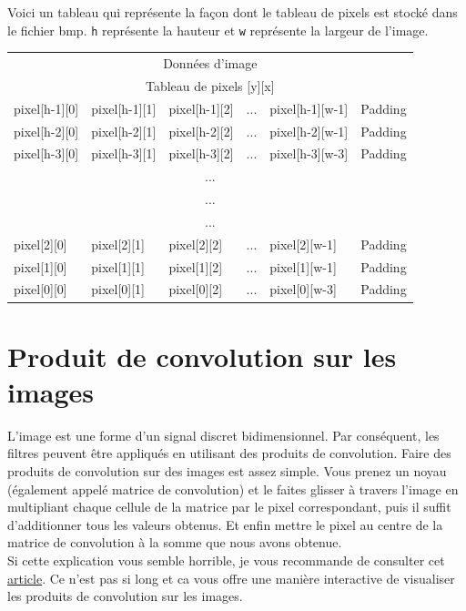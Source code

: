 \documentclass[a4paper]{article}
\begin{document}
	Voici un tableau qui représente la façon dont le tableau de pixels est stocké dans le fichier bmp. \texttt{h} représente la hauteur et \texttt{w} représente la largeur de l'image.
	\begin{center}
		\begin{tabular}{ | p{2.2cm} | p{2.2cm} | p{2.2cm} | p{1.5cm} | p{2.2cm} | p{1.5cm} | }
			\hline
			\multicolumn{6}{|c|}{Données d'image} \\
			\multicolumn{6}{|c|}{Tableau de pixels [y][x]} \\
			\hline
			pixel[h-1][0] & pixel[h-1][1] & pixel[h-1][2] & ... & pixel[h-1][w-1] & Padding \\
			\hline
			pixel[h-2][0] & pixel[h-2][1] & pixel[h-2][2] & ... & pixel[h-2][w-1] & Padding \\
			\hline
			pixel[h-3][0] & pixel[h-3][1] & pixel[h-3][2] & ... & pixel[h-3][w-3] & Padding \\
			\hline
			\multicolumn{6}{|c|}{...} \\
			\multicolumn{6}{|c|}{...} \\
			\multicolumn{6}{|c|}{...} \\
			\hline
			pixel[2][0] & pixel[2][1] & pixel[2][2] & ... & pixel[2][w-1] & Padding \\
			\hline
			pixel[1][0] & pixel[1][1] & pixel[1][2] & ... & pixel[1][w-1] & Padding \\
			\hline
			pixel[0][0] & pixel[0][1] & pixel[0][2] & ... & pixel[0][w-3] & Padding \\
			\hline
		\end{tabular}
	\end{center}
	
	\section*{Produit de convolution sur les images}
	L'image est une forme d'un signal discret bidimensionnel. Par conséquent, les filtres peuvent être appliqués en utilisant des produits de convolution. Faire des produits de convolution sur des images est assez simple. Vous prenez un noyau (également appelé matrice de convolution) et le faites glisser à travers l'image en multipliant chaque cellule de la matrice par le pixel correspondant, puis il suffit d'additionner tous les valeurs obtenus. Et enfin mettre le pixel au centre de la matrice de convolution à la somme que nous avons obtenue.\\ Si cette explication vous semble horrible, je vous recommande de consulter cet \href{https://setosa.io/ev/image-kernels/}{article}. Ce n'est pas si long et ca vous offre une manière interactive de visualiser les produits de convolution sur les images.
	
\end{document}
